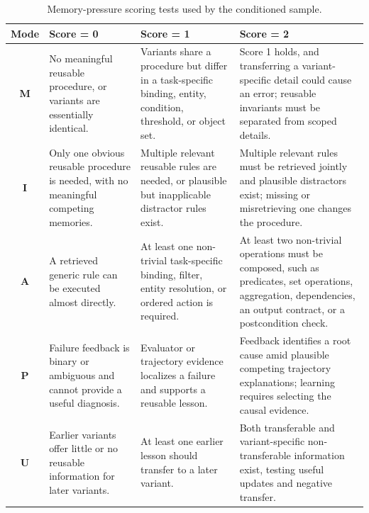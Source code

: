 \documentclass[11pt]{article}
\begin{document}
\begin{table}[htbp]
\centering
\footnotesize
\setlength{\tabcolsep}{5pt}
\renewcommand{\arraystretch}{1.22}
\caption{Memory-pressure scoring tests used by the conditioned sample.}
\label{tab:memory-pressure-tests}
\begin{tabularx}{\textwidth}{@{}c
  >{\raggedright\arraybackslash}X
  >{\raggedright\arraybackslash}X
  >{\raggedright\arraybackslash}X@{}}
\toprule
Mode & Score = 0 & Score = 1 & Score = 2 \\
\midrule
\textbf{M}
  & No meaningful reusable procedure, or variants are essentially identical.
  & Variants share a procedure but differ in a task-specific binding, entity, condition, threshold, or object set.
  & Score 1 holds, and transferring a variant-specific detail could cause an error; reusable invariants must be separated from scoped details. \\
\addlinespace
\textbf{I}
  & Only one obvious reusable procedure is needed, with no meaningful competing memories.
  & Multiple relevant reusable rules are needed, or plausible but inapplicable distractor rules exist.
  & Multiple relevant rules must be retrieved jointly and plausible distractors exist; missing or misretrieving one changes the procedure. \\
\addlinespace
\textbf{A}
  & A retrieved generic rule can be executed almost directly.
  & At least one non-trivial task-specific binding, filter, entity resolution, or ordered action is required.
  & At least two non-trivial operations must be composed, such as predicates, set operations, aggregation, dependencies, an output contract, or a postcondition check. \\
\addlinespace
\textbf{P}
  & Failure feedback is binary or ambiguous and cannot provide a useful diagnosis.
  & Evaluator or trajectory evidence localizes a failure and supports a reusable lesson.
  & Feedback identifies a root cause amid plausible competing trajectory explanations; learning requires selecting the causal evidence. \\
\addlinespace
\textbf{U}
  & Earlier variants offer little or no reusable information for later variants.
  & At least one earlier lesson should transfer to a later variant.
  & Both transferable and variant-specific non-transferable information exist, testing useful updates and negative transfer. \\
\bottomrule
\end{tabularx}
\end{table}
\end{document}
